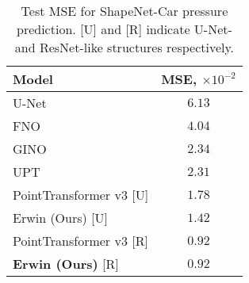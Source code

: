 \begin{table}
\vspace{-5pt}
\caption{Test MSE for ShapeNet-Car pressure prediction. [U] and [R] indicate U-Net- and ResNet-like structures respectively.}
\label{table:shapenet}
\begin{center}
\begin{small}
\begin{sc}
\begin{tabular}{lc}
\toprule
Model & MSE, $\times 10^{-2}$ \\
\midrule
U-Net & $6.13$ \\
FNO & $4.04$ \\
GINO & $2.34$ \\
UPT & $2.31$ \\
PointTransformer v3 [U] & $1.78$ \\
Erwin (Ours) [U] & $1.42$ \\
PointTransformer v3 [R] & $\mathbf{0.92}$ \\
\textbf{Erwin (Ours)} [R] & $\mathbf{0.92}$ \\
\bottomrule
\end{tabular}
\vspace{-10pt}
\end{sc}
\end{small}
\end{center}
\end{table}